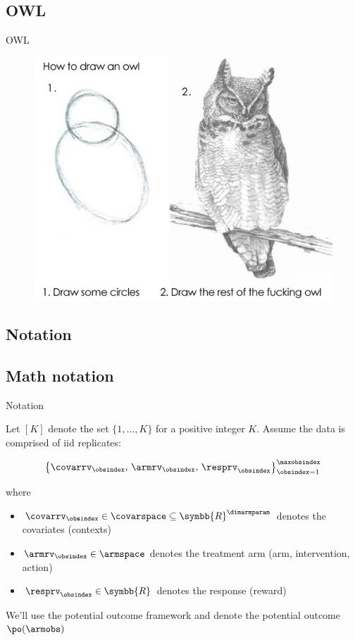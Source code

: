 \documentclass[aspectratio=169, professionalfonts]{beamer}
\begin{document}
\subsection{OWL}
\begin{frame}{OWL}
	\begin{figure}
		\includegraphics[width=.6\textwidth]{figures/how-to-draw-an-owl}
	\end{figure}
\end{frame}
\subsection{Notation}
\subsection{Math notation}
\begin{frame}[label={sec:org00d2d44}]{Notation}

	Let $[K]$ denote the set $\{1, \ldots, K \}$ for a positive integer $K$. Assume
	the data is comprised of iid replicates:

	\begin{equation}
		\left\{{\covarrv}_{\obsindex},\, {\armrv}_{\obsindex},\,
		{\resprv}_{\obsindex} \right\}_{\obsindex = 1}^{\maxobsindex}
	\end{equation}

	where
	\vfill \pause

	\begin{itemize}
		\item $\covarrv_{\obsindex} \in \covarspace \subseteq
			      \symbb{R}^{\dimarmparam}$ denotes the covariates (contexts)

		\item $\armrv_{ \obsindex} \in \armspace$ denotes the treatment arm (arm,
		      intervention, action)

		\item $\resprv_{ \obsindex} \in \symbb{R}$ denotes the response (reward)
	\end{itemize}

	\vfill \pause

	We'll use the potential outcome framework and denote the potential outcome 	$\po(\armobs)$

\end{frame}
\end{document}
